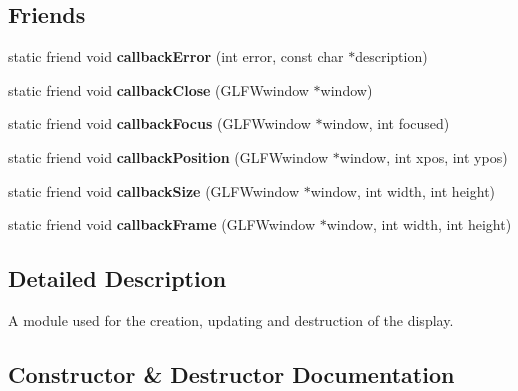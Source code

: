 \subsection*{Friends}
\begin{DoxyCompactItemize}
\item 
\mbox{\label{classflounder_1_1display_afc3020989fe0bea586c4d29c212aa133}} 
static friend void {\bfseries callback\+Error} (int error, const char $\ast$description)
\item 
\mbox{\label{classflounder_1_1display_ab8f70edb9d5031a7096126204355e7d6}} 
static friend void {\bfseries callback\+Close} (G\+L\+F\+Wwindow $\ast$window)
\item 
\mbox{\label{classflounder_1_1display_ad73b79cccf7cb1720abb1576fadb6118}} 
static friend void {\bfseries callback\+Focus} (G\+L\+F\+Wwindow $\ast$window, int focused)
\item 
\mbox{\label{classflounder_1_1display_a669fa2672c0ea83c27f30860b8fae4ca}} 
static friend void {\bfseries callback\+Position} (G\+L\+F\+Wwindow $\ast$window, int xpos, int ypos)
\item 
\mbox{\label{classflounder_1_1display_a3b32ab42fc1ab57513d277fdcdd0f83f}} 
static friend void {\bfseries callback\+Size} (G\+L\+F\+Wwindow $\ast$window, int width, int height)
\item 
\mbox{\label{classflounder_1_1display_a0766de23b80536533330a6f97bded5be}} 
static friend void {\bfseries callback\+Frame} (G\+L\+F\+Wwindow $\ast$window, int width, int height)
\end{DoxyCompactItemize}


\subsection{Detailed Description}
A module used for the creation, updating and destruction of the display. 



\subsection{Constructor \& Destructor Documentation}
\mbox{\label{classflounder_1_1display_ac0a3910222a928f1fc60193cd65c0530}} 
